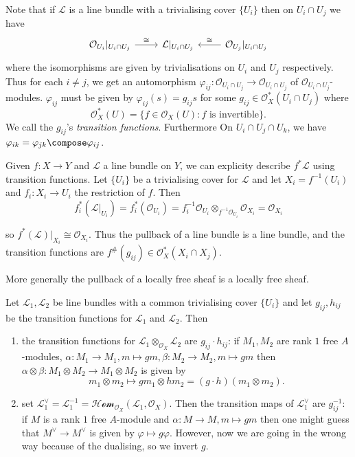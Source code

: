 \documentclass[a4paper]{article}
\newcommand{\sh}[1]{\mathcal{#1}} %
\begin{document}
\begin{eg}
  Note that if \(\sh L\) is a line bundle with a trivialising cover \(\{U_i\}\) then on \(U_i \cap U_j\) we have
  \[
    \begin{tikzcd}
      \sh O_{U_i}|_{U_i \cap U_j} \ar[r, "\cong"] & \sh L|_{U_i \cap U_j} & \sh O_{U_j}|_{U_i \cap U_j} \ar[l, "\cong"']
    \end{tikzcd}
  \]
  where the isomorphisms are given by trivialisations on \(U_i\) and \(U_j\) respectively. Thus for each \(i \neq j\), we get an automorphism \(\varphi_{ij}: \sh O_{U_i \cap U_j} \to \sh O_{U_i \cap U_j}\) of \(\sh O_{U_i \cap U_j}\)-modules. \(\varphi_{ij}\) must be given by \(\varphi_{ij}(s) = g_{ij} s\) for some \(g_{ij} \in \sh O_X^*(U_i \cap U_j)\) where
  \[
    \sh O_X^*(U) = \{f \in \sh O_X(U): f \text{ is invertible}\}.
  \]
  We call the \(g_{ij}\)'s \emph{transition functions}. Furthermore On \(U_i \cap U_j \cap U_k\), we have \(\varphi_{ik} = \varphi_{jk} \compose \varphi_{ij}\).

  Given \(f: X \to Y\) and \(\sh L\) a line bundle on \(Y\), we can explicity describe \(f^* \sh L\) using transition functions. Let \(\{U_i\}\) be a trivialising cover for \(\sh L\) and let \(X_i = f^{-1}(U_i)\) and \(f_i: X_i \to U_i\) the restriction of \(f\). Then
  \[
    f_i^*(\sh L|_{U_i}) = f_i^*(\sh O_{U_i}) = f_i^{-1} \sh O_{U_i} \otimes_{f^{-1} \sh O_{U_i}} \sh O_{X_i} = \sh O_{X_i}
  \]

  so \(f^*(\sh L)|_{X_i} \cong \sh O_{X_i}\). Thus the pullback of a line bundle is a line bundle, and the transition functions are \(f^\#(g_{ij}) \in \sh O_X^*(X_i \cap X_j)\).

  More generally the pullback of a locally free sheaf is a locally free sheaf.
\end{eg}

\begin{eg}
  Let \(\sh L_1, \sh L_2\) be line bundles with a common trivialising cover \(\{U_i\}\) and let \(g_{ij}, h_{ij}\) be the transition functions for \(\sh L_1\) and \(\sh L_2\). Then
  \begin{enumerate}
  \item the transition functions for \(\sh L_1 \otimes_{\sh O_X} \sh L_2\) are \(g_{ij} \cdot h_{ij}\): if \(M_1, M_2\) are rank \(1\) free \(A\)-modules, \(\alpha: M_1\to M_1, m \mapsto gm, \beta: M_2 \to M_2, m \mapsto gm\) then \(\alpha \otimes \beta: M_1 \otimes M_2 \to M_1 \otimes M_2\) is given by
    \[
      m_1 \otimes m_2 \mapsto gm_1 \otimes hm_2 = (g\cdot h)(m_1 \otimes m_2).
    \]
  \item set \(\sh L_1^\vee = \sh L_1^{-1} = \sh{Hom}_{\sh O_X}(\sh L_1, \sh O_X)\). Then the transition maps of \(\sh L_1^\vee\) are \(g_{ij}^{-1}\): if \(M\) is a rank \(1\) free \(A\)-module and \(\alpha: M \to M, m \mapsto gm\) then one might guess that \(M^\vee \to M^\vee\) is given by \(\varphi \mapsto g \varphi\). However, now we are going in the wrong way because of the dualising, so we invert \(g\).
  \end{enumerate}
\end{eg}
\end{document}
